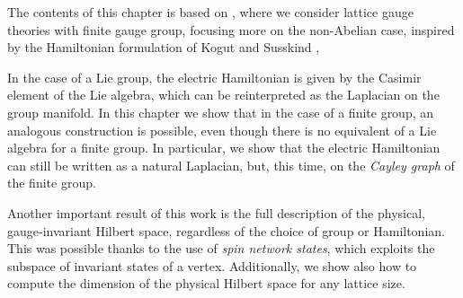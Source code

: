 \begin{description}[labelsep=1.1em]
    \item[Chap.~\ref{chap:finite_group_gauge_theories}]
        The contents of this chapter is based on \cite{pradhan_unpublished}, where we consider lattice gauge theories with finite gauge group, focusing more on the non-Abelian case,
        inspired by the Hamiltonian formulation of Kogut and Susskind \cite{kogut1975hamiltonian},

        In the case of a Lie group, the electric Hamiltonian is given by the Casimir element of the Lie algebra, which can be reinterpreted as the Laplacian on the group manifold.
        In this chapter we show that in the case of a finite group, an analogous construction is possible, even though there is no equivalent of a Lie algebra for a finite group.
        In particular, we show that the electric Hamiltonian can still be written as a natural Laplacian, but, this time, on the \emph{Cayley graph} of the finite group.

        Another important result of this work is the full description of the physical, gauge-invariant Hilbert space, regardless of the choice of group or Hamiltonian.
        This was possible thanks to the use of \emph{spin network states}, which exploits the subspace of invariant states of a vertex.
        Additionally, we show also how to compute the dimension of the physical Hilbert space for any lattice size.

\end{description}

